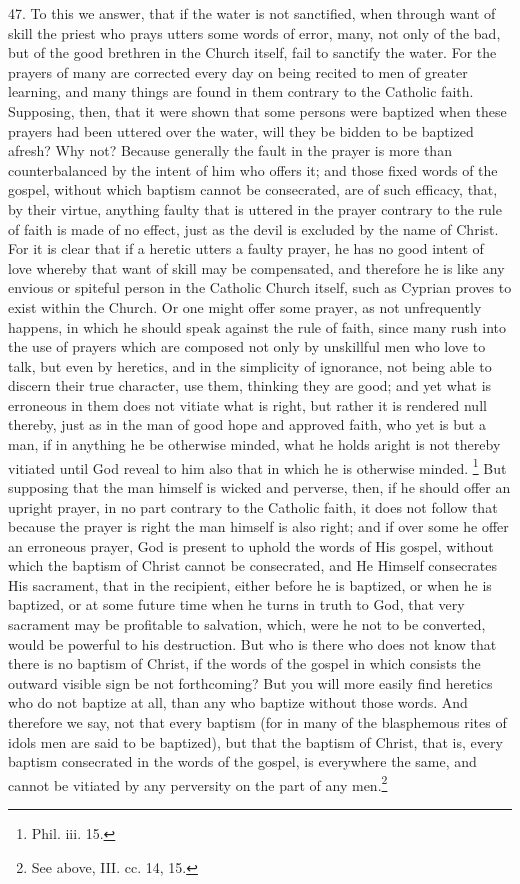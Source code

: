 47. To this we answer, that if the water is not sanctified, when through want of skill the priest who prays utters some words of error, many, not only of the bad, but of the good brethren in the Church itself, fail to sanctify the water. For the prayers of many are corrected every day on being recited to men of greater learning, and many things are found in them contrary to the Catholic faith. Supposing, then, that it were shown that some persons were baptized when these prayers had been uttered over the water, will they be bidden to be baptized afresh? Why not? Because generally the fault in the prayer is more than counterbalanced by the intent of him who offers it; and those fixed words of the gospel, without which baptism cannot be consecrated, are of such efficacy, that, by their virtue, anything faulty that is uttered in the prayer contrary to the rule of faith is made of no effect, just as the devil is excluded by the name of Christ. For it is clear that if a heretic utters a faulty prayer, he has no good intent of love whereby that want of skill may be compensated, and therefore he is like any envious or spiteful person in the Catholic Church itself, such as Cyprian proves to exist within the Church. Or one might offer some prayer, as not unfrequently happens, in which he should speak against the rule of faith, since many rush into the use of prayers which are composed not only by unskillful men who love to talk, but even by heretics, and in the simplicity of ignorance, not being able to discern their true character, use them, thinking they are good; and yet what is erroneous in them does not vitiate what is right, but rather it is rendered null thereby, just as in the man of good hope and approved faith, who yet is but a man, if in anything he be otherwise minded, what he holds aright is not thereby vitiated until God reveal to him also that in which he is otherwise minded. \footnote{\par  Phil. iii. 15.} But supposing that the man himself is wicked and perverse, then, if he should offer an upright prayer, in no part contrary to the Catholic faith, it does not follow that because the prayer is right the man himself is also right; and if over some he offer an erroneous prayer, God is present to uphold the words of His gospel, without which the baptism of Christ cannot be consecrated, and He Himself consecrates His sacrament, that in the recipient, either before he is baptized, or when he is baptized, or at some future time when he turns in truth to God, that very sacrament may be profitable to salvation, which, were he not to be converted, would be powerful to his destruction. But who is there who does not know that there is no baptism of Christ, if the words of the gospel in which consists the outward visible sign be not forthcoming? But you will more easily find heretics who do not baptize at all, than any who baptize without those words. And therefore we say, not that every baptism (for in many of the blasphemous rites of idols men are said to be baptized), but that the baptism of Christ, that is, every baptism consecrated in the words of the gospel, is everywhere the same, and cannot be vitiated by any perversity on the part of any men.\footnote{\par  See above, III. cc. 14, 15.}

